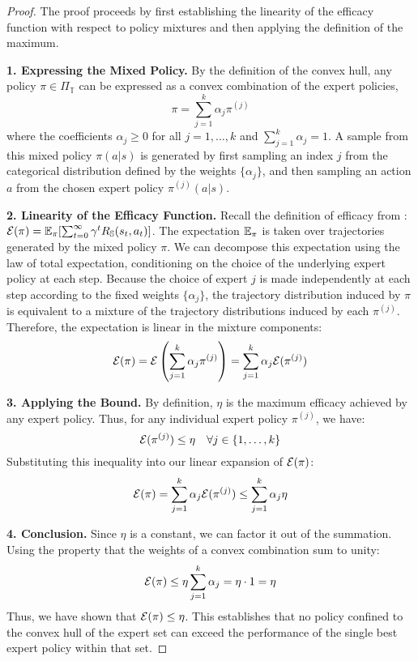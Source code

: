 \begin{proof}
The proof proceeds by first establishing the linearity of the efficacy function with respect to policy mixtures and then applying the definition of the maximum.

\noindent\textbf{1. Expressing the Mixed Policy.} By the definition of the convex hull, any policy $\pi \in \Pi_{\mathbb{T}}$ can be expressed as a convex combination of the expert policies,
\[
\pi = \sum_{j=1}^k \alpha_j \pi^{(j)}
\]
where the coefficients $\alpha_j \ge 0$ for all $j=1, \dots, k$ and $\sum_{j=1}^k \alpha_j = 1$. A sample from this mixed policy $\pi(a|s)$ is generated by first sampling an index $j$ from the categorical distribution defined by the weights $\{\alpha_j\}$, and then sampling an action $a$ from the chosen expert policy $\pi^{(j)}(a|s)$.

\noindent\textbf{2. Linearity of the Efficacy Function.} Recall the definition of efficacy from : $\mathcal{E}(\pi) = \mathbb{E}_{\pi} [ \sum_{t=0}^{\infty} \gamma^t R_{\mathbb{S}}(s_t, a_t) ]$. The expectation $\mathbb{E}_{\pi}$ is taken over trajectories generated by the mixed policy $\pi$. We can decompose this expectation using the law of total expectation, conditioning on the choice of the underlying expert policy at each step. Because the choice of expert $j$ is made independently at each step according to the fixed weights $\{\alpha_j\}$, the trajectory distribution induced by $\pi$ is equivalent to a mixture of the trajectory distributions induced by each $\pi^{(j)}$. Therefore, the expectation is linear in the mixture components:
\[
\mathcal{E}(\pi) = \mathcal{E}\left(\sum_{j=1}^k \alpha_j \pi^{(j)}\right) = \sum_{j=1}^k \alpha_j \mathcal{E}(\pi^{(j)})
\]

\noindent\textbf{3. Applying the Bound.} By definition, $\eta$ is the maximum efficacy achieved by any expert policy. Thus, for any individual expert policy $\pi^{(j)}$, we have:
\[
\mathcal{E}(\pi^{(j)}) \le \eta \quad \forall j \in \{1, \dots, k\}
\]
Substituting this inequality into our linear expansion of $\mathcal{E}(\pi)$:
\[
\mathcal{E}(\pi) = \sum_{j=1}^k \alpha_j \mathcal{E}(\pi^{(j)}) \le \sum_{j=1}^k \alpha_j \eta
\]

\noindent\textbf{4. Conclusion.} Since $\eta$ is a constant, we can factor it out of the summation. Using the property that the weights of a convex combination sum to unity:
\[
\mathcal{E}(\pi) \le \eta \sum_{j=1}^k \alpha_j = \eta \cdot 1 = \eta
\]
Thus, we have shown that $\mathcal{E}(\pi) \le \eta$. This establishes that no policy confined to the convex hull of the expert set can exceed the performance of the single best expert policy within that set.
\end{proof}

